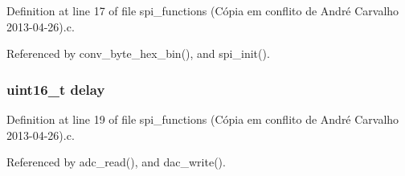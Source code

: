 Definition at line 17 of file spi\-\_\-functions (\-Cópia em conflito de André Carvalho 2013-\/04-\/26).\-c.



Referenced by conv\-\_\-byte\-\_\-hex\-\_\-bin(), and spi\-\_\-init().

\hypertarget{spi__functions_01_07C_xC3_xB3pia_01em_01conflito_01de_01Andr_xC3_xA9_01Carvalho_012013-04-26_08_8c_adc4674f6ea53803d98fa2ec36759e77d}{
\subsubsection[{delay}]{\setlength{\rightskip}{0pt plus 5cm}uint16\-\_\-t delay\hspace{0.3cm}{\ttfamily [static]}}}\label{spi__functions_01_07C_xC3_xB3pia_01em_01conflito_01de_01Andr_xC3_xA9_01Carvalho_012013-04-26_08_8c_adc4674f6ea53803d98fa2ec36759e77d}


Definition at line 19 of file spi\-\_\-functions (\-Cópia em conflito de André Carvalho 2013-\/04-\/26).\-c.



Referenced by adc\-\_\-read(), and dac\-\_\-write().

